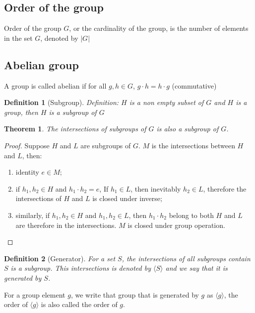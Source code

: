 \documentclass{amsart}
\newtheorem{definition}{Definition}
\newtheorem{theorem}{Theorem}
\begin{document}
\subsection*{Order of the group}
    Order of the group $G$, or the cardinality of the group, is the number of elements in the set $G$, denoted by $|G|$
\vspace{-10pt} %
\subsection*{Abelian group}
    A group is called abelian if for all $g, h \in G$, $g\cdot h = h \cdot g$ (commutative)


\begin{definition}[Subgroup]
    Definition: $H$ is a non empty subset of $G$ and $H$ is a group, then $H$ is a subgroup of $G$
\end{definition}

\begin{theorem}
    The intersections of subgroups of $G$ is also a subgroup of $G$.
\end{theorem}
\begin{proof}
    Suppose $H$ and $L$ are subgroups of $G$. $M$ is the intersections between $H$ and $L$, then:
    \begin{enumerate}
        \item identity $e \in M$;
        \item if $h_1, h_2 \in H$ and $h_1 \cdot h_2 = e$, If $h_1\in L$, then inevitably $h_2 \in L$, therefore the intersections of $H$ and $L$ is closed under inverse;
        \item similarly, if $h_1, h_2 \in H$ and $h_1, h_2 \in L$, then $h_1\cdot h_2$ belong to both $H$ and $L$ are therefore in the intersections. $M$ is closed under group operation.
    \end{enumerate}
\end{proof}

\vspace{10pt}

\begin{definition}[Generator]
    For a set $S$, the intersections of all subgroups contain $S$ is a subgroup. This intersections is denoted by $\langle S\rangle$ and we say that it is generated by $S$. 
\end{definition}
For a group element $g$, we write that group that is generated by $g$ as $\langle g \rangle$, the order of $\langle g \rangle$ is also called the order of $g$. 
\end{document}
